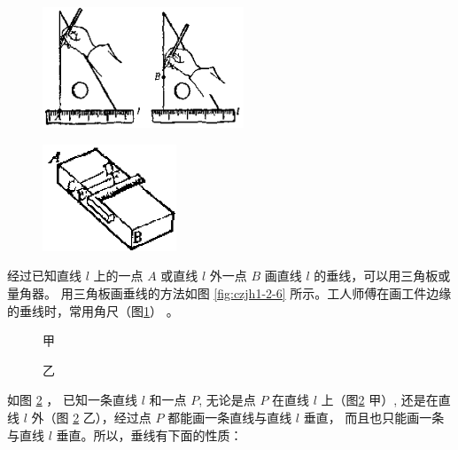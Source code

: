 \begin{figure}[htbp]
    \centering
    \begin{minipage}[b]{7cm}
        \centering
        \includegraphics[width=6cm]{../pic/czjh1-ch2-06.png}
        \caption{}\label{fig:czjh1-2-6}
    \end{minipage}
    \qquad
    \begin{minipage}[b]{7cm}
        \centering
        \includegraphics[width=4cm]{../pic/czjh1-ch2-07.png}
        \caption{}\label{fig:czjh1-2-7}
    \end{minipage}
\end{figure}

经过已知直线 $l$ 上的一点 $A$ 或直线 $l$ 外一点 $B$ 画直线 $l$ 的垂线，可以用三角板或量角器。
用三角板画垂线的方法如图 \ref{fig:czjh1-2-6} 所示。工人师傅在画工件边缘的垂线时，常用角尺（图\ref{fig:czjh1-2-7}） 。

\begin{figure}[htbp]
    \centering
    \begin{minipage}[b]{7cm}
        \centering
        
        \caption*{甲}
    \end{minipage}
    \qquad
    \begin{minipage}[b]{7cm}
        \centering
        
        \caption*{乙}
    \end{minipage}
    \caption{}\label{fig:czjh1-2-8}
\end{figure}

如图 \ref{fig:czjh1-2-8} ， 已知一条直线 $l$ 和一点 $P$, 无论是点 $P$ 在直线 $l$ 上（图\ref{fig:czjh1-2-8} 甲）,
还是在直线 $l$ 外（图 \ref{fig:czjh1-2-8} 乙），经过点 $P$ 都能画一条直线与直线 $l$ 垂直，
而且也只能画一条与直线 $l$ 垂直。所以，垂线有下面的性质：

